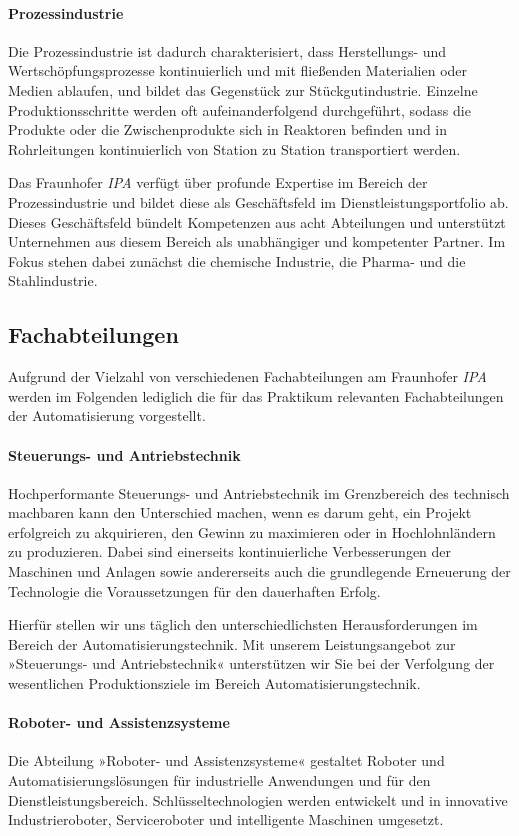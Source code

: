\paragraph{Prozessindustrie}
Die Prozessindustrie ist dadurch charakterisiert, dass Herstellungs- und Wertschöpfungsprozesse kontinuierlich und mit fließenden Materialien oder Medien ablaufen,
und bildet das Gegenstück zur Stückgutindustrie. Einzelne Produktionsschritte werden oft aufeinanderfolgend durchgeführt, sodass die Produkte oder die Zwischenprodukte
sich in Reaktoren befinden und in Rohrleitungen kontinuierlich von Station zu Station transportiert werden.

Das Fraunhofer \emph{IPA} verfügt über profunde Expertise im Bereich der Prozessindustrie und bildet diese als Geschäftsfeld im Dienstleistungsportfolio ab.
Dieses Geschäftsfeld bündelt Kompetenzen aus acht Abteilungen und unterstützt Unternehmen aus diesem Bereich als unabhängiger und kompetenter Partner.
Im Fokus stehen dabei zunächst die chemische Industrie, die Pharma- und die Stahlindustrie.

\subsection{Fachabteilungen}
Aufgrund der Vielzahl von verschiedenen Fachabteilungen am Fraunhofer \emph{IPA} werden im Folgenden lediglich die für das Praktikum relevanten Fachabteilungen der Automatisierung vorgestellt.

\paragraph{Steuerungs- und Antriebstechnik}
Hochperformante Steuerungs- und Antriebstechnik im Grenzbereich des technisch machbaren kann den Unterschied machen, wenn es darum geht, ein Projekt erfolgreich zu akquirieren,
den Gewinn zu maximieren oder in Hochlohnländern zu produzieren. Dabei sind einerseits kontinuierliche Verbesserungen der Maschinen und Anlagen sowie andererseits auch die grundlegende
Erneuerung der Technologie die Voraussetzungen für den dauerhaften Erfolg.

Hierfür stellen wir uns täglich den unterschiedlichsten Herausforderungen im Bereich der Automatisierungstechnik. Mit unserem Leistungsangebot zur »Steuerungs- und Antriebstechnik« unterstützen wir Sie bei der Verfolgung der wesentlichen Produktionsziele im Bereich Automatisierungstechnik.
\paragraph{Roboter- und Assistenzsysteme}
Die Abteilung »Roboter- und Assistenzsysteme« gestaltet Roboter und Automatisierungslösungen für industrielle Anwendungen und für den Dienstleistungsbereich.
Schlüsseltechnologien werden entwickelt und in innovative Industrieroboter, Serviceroboter und intelligente Maschinen umgesetzt.

